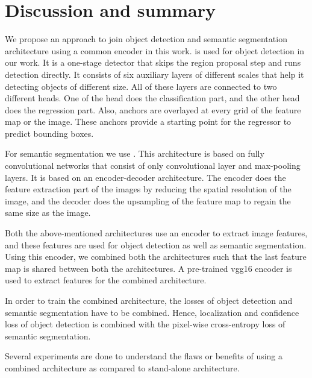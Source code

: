 \lhead{\thepage}

\chapter{Discussion and summary}

We propose an approach to join object detection and semantic segmentation architecture using a common encoder in this work. \cite{liu2016ssd} is used for object detection in our work. It is a one-stage detector that skips the region proposal step and runs detection directly. It consists of six auxiliary layers of different scales that help it detecting objects of different size. All of these layers are connected to two different heads. One of the head does the classification part, and the other head does the regression part. Also, anchors are overlayed at every grid of the feature map or the image. These anchors provide a starting point for the regressor to predict bounding boxes.
\par
For semantic segmentation we use \cite{long2015fully}. This architecture is based on fully convolutional networks that consist of only convolutional layer and max-pooling layers. It is based on an encoder-decoder architecture. The encoder does the feature extraction part of the images by reducing the spatial resolution of the image, and the decoder does the upsampling of the feature map to regain the same size as the image.
\par
Both the above-mentioned architectures use an encoder to extract image features, and these features are used for object detection as well as semantic segmentation. Using this encoder, we combined both the architectures such that the last feature map is shared between both the architectures. 
A pre-trained \ac{vgg}16 encoder is used to extract features for the combined architecture. 
\par
In order to train the combined architecture, the losses of object detection and semantic segmentation have to be combined. Hence, localization and confidence loss of object detection is combined with the pixel-wise cross-entropy loss of semantic segmentation. 
\par
Several experiments are done to understand the flaws or benefits of using a combined architecture as compared to stand-alone architecture. 
\clearpage
\pagestyle{plain}
\afterpage{\null\newpage}